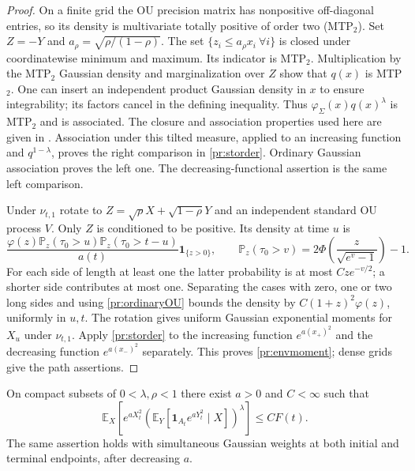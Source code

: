 \begin{proof}
On a finite grid the OU precision matrix has nonpositive off-diagonal
entries, so its density is multivariate totally positive of order two
(MTP$_2$). Set $Z=-Y$ and $a_\rho=\sqrt{\rho/(1-\rho)}$.
The set $\{z_i\le a_\rho x_i\ \forall i\}$ is closed under coordinatewise
minimum and maximum. Its indicator is MTP$_2$. Multiplication by the
MTP$_2$ Gaussian density and marginalization over $Z$ show that $q(x)$
is MTP$_2$. One can insert an independent product Gaussian density in
$x$ to ensure integrability; its factors cancel in the defining inequality.
Thus $\varphi_\Sigma(x)q(x)^\lambda$ is MTP$_2$ and is associated.
The closure and association properties used here are given in
\cite[Proposition~3.4 and Section~3]{Fallat}.
Association under this tilted measure, applied to an increasing function
and $q^{1-\lambda}$, proves the right comparison in
\eqref{pr:storder}. Ordinary Gaussian association proves the left one.
The decreasing-functional assertion is the same left comparison.

Under $\nu_{t,1}$ rotate to
$Z=\sqrt\rho X+\sqrt{1-\rho}Y$ and an independent standard OU process
$V$. Only $Z$ is conditioned to be positive. Its density at time $u$ is
\[
 \frac{\varphi(z)\mathbb P_z(\tau_0>u)
                    \mathbb P_z(\tau_0>t-u)}{a(t)}
                 \boldsymbol1_{\{z>0\}},
 \qquad
 \mathbb P_z(\tau_0>v)=2\Phi\left(\frac z{\sqrt{e^v-1}}\right)-1.
\]
For each side of length at least one the latter probability is at most
$Cz e^{-v/2}$; a shorter side contributes at most one. Separating the
cases with zero, one or two long sides and using \eqref{pr:ordinaryOU}
bounds the density by $C(1+z)^2\varphi(z)$, uniformly in $u,t$.
The rotation gives uniform Gaussian exponential moments for $X_u$ under
$\nu_{t,1}$. Apply \eqref{pr:storder} to the increasing function
$e^{a(x_+)^2}$ and the decreasing function $e^{a(x_-)^2}$ separately.
This proves \eqref{pr:envmoment}; dense grids give the path assertions.
\end{proof}

\begin{lemma}\label{pr:filter}
On compact subsets of $0<\lambda,\rho<1$ there exist $a>0$ and $C<\infty$
such that
\begin{equation}
 \mathbb E_X\left[e^{aX_t^2}
  \left(\mathbb E_Y[\boldsymbol1_{A_t}e^{aY_t^2}\mid X]\right)^\lambda
             \right]\le C F(t).                            \label{pr:mixed}
\end{equation}
The same assertion holds with simultaneous Gaussian weights at both
initial and terminal endpoints, after decreasing $a$.
\end{lemma}

